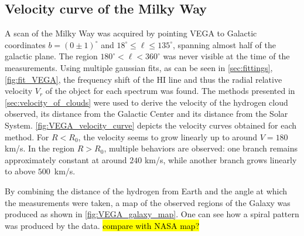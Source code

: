 \subsection{Velocity curve of the Milky Way}
A scan of the Milky Way was acquired by pointing VEGA to Galactic coordinates $b = (0\pm 1)^\circ$ and $18^\circ \leq \ell \leq 135^\circ$, spanning almost half of the galactic plane. The region $180^\circ < \ell < 360^\circ$ was never visible at the time of the measurements.
Using multiple gaussian fits, as can be seen in \autoref{sec:fittings}, \autoref{fig:fit_VEGA}, the frequency shift of the HI line and thus the radial relative velocity $V_r$ of the object for each spectrum was found. The methods presented in \autoref{sec:velocity_of_clouds} were used to derive the velocity of the hydrogen cloud observed, its distance from the Galactic Center and its distance from the Solar System.
\autoref{fig:VEGA_velocity_curve} depicts the velocity curves obtained for each method. For $R < R_0$, the velocity seems to grow linearly up to around $V=180$ km/s. In the region $R > R_0$, multiple behaviors are observed: one branch remains approximately constant at around $240$ km/s, while another branch grows linearly to above \mbox{$500$ km/s.}

By combining the distance of the hydrogen from Earth and the angle at which the measurements were taken, a map of the observed regions of the Galaxy was produced as shown in \autoref{fig:VEGA_galaxy_map}. One can see how a spiral pattern was produced by the data. \hl{compare with NASA map?}


